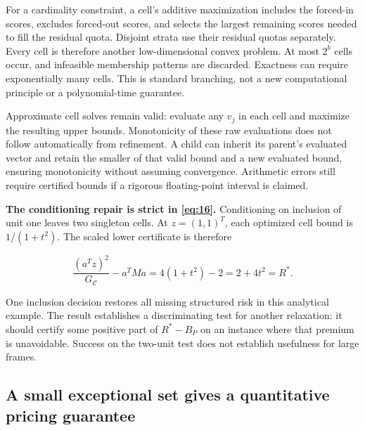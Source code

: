 \documentclass[11pt]{article}
\begin{document}
For a cardinality constraint, a cell's additive maximization includes
the forced-in scores, excludes forced-out scores, and selects the
largest remaining scores needed to fill the residual quota. Disjoint
strata use their residual quotas separately. Every cell is therefore
another low-dimensional convex problem. At most \(2^b\) cells occur, and
infeasible membership patterns are discarded. Exactness can require
exponentially many cells. This is standard branching, not a new
computational principle or a polynomial-time guarantee.

Approximate cell solves remain valid: evaluate any \(v_j\) in each cell
and maximize the resulting upper bounds. Monotonicity of these raw
evaluations does not follow automatically from refinement. A child can
inherit its parent's evaluated vector and retain the smaller of that
valid bound and a new evaluated bound, ensuring monotonicity without
assuming convergence. Arithmetic errors still require certified bounds
if a rigorous floating-point interval is claimed.

\textbf{The conditioning repair is strict in \eqref{eq:16}.}
Conditioning on inclusion of unit one leaves two singleton cells. At
\(z=(1,1)^T\), each optimized cell bound is \(1/(1+t^2)\). The scaled
lower certificate is therefore

\begin{equation}\label{eq:27}
\frac{(a^Tz)^2}{G_{\mathcal C}}-a^TMa
=4(1+t^2)-2=2+4t^2=R^*. 
\end{equation}

One inclusion decision restores all missing structured risk in this
analytical example. The result establishes a discriminating test for
another relaxation: it should certify some positive part of \(R^*-B_P\)
on an instance where that premium is unavoidable. Success on the
two-unit test does not establish usefulness for large frames.

\subsection{A small exceptional set gives a quantitative pricing
guarantee}\label{a-small-exceptional-set-gives-a-quantitative-pricing-guarantee}
\end{document}
